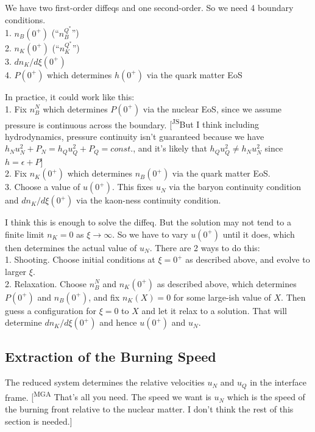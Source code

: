 \documentclass[11pt]{article}
\newcommand{\mga}[1]{{\color[rgb]{0.8,0,0}#1}}
\newcommand{\mgacom}[1]{\textsf{\color[rgb]{0.6,0,0}[\textsuperscript{MGA} #1]}}
\newcommand{\JScom}[1]{\textsf{\color{violet} [\textsuperscript{JS}#1]}}
\begin{document}
\mga{We have two first-order diffeqs and one second-order. So we need 4 boundary conditions. \\
1. $n_B(0^+)$ \quad (``$n_B^{Q^*}$'') \\
2. $n_K(0^+)$ \quad (``$n_K^{Q^*}$'') \\
3. $dn_K/d\xi(0^+)$ \\
4. $P(0^+)$ which determines $h(0^+)$ via the quark matter EoS

\medskip
In practice, it could work like this: \\
1. Fix $n_B^N$ which determines $P(0^+)$ via the nuclear EoS, since we assume pressure is continuous across the boundary. \JScom{But I think including hydrodynamics, pressure continuity isn't guaranteed because we have $h_Nu_N^2 + P_N = h_Qu_Q^2 + P_Q = const.$, and it's likely that $h_Qu_Q^2 \neq h_N u_N^2$ since $h = \epsilon + P$}\\
2. Fix $n_K(0^+)$ which determines $n_B(0^+)$ via the quark matter EoS.\\
3. Choose a value of $u(0^+)$. This fixes $u_N$ via the baryon continuity condition and $dn_K/d\xi(0^+)$ via the kaon-ness continuity condition. 

\bigskip
I think this is enough to solve the diffeq. But the solution may not tend to a finite limit $n_K=0$ as 
$\xi\to\infty$. So we have to vary
$u(0^+)$ until it does, which then 
determines the actual value of $u_N$. 
There are 2 ways to do this:\\
1. Shooting. Choose initial conditions at $\xi=0^+$ as described above, and evolve to larger $\xi$. \\
2. Relaxation. Choose $n_B^N$ and $n_K(0^+)$ as described above, which determines $P(0^+)$ and $n_B(0^+)$, and fix $n_K(X)=0$ for some large-ish value of $X$. Then guess a configuration for $\xi=0$ to $X$ and let it relax to a solution. That will determine $dn_K/d\xi(0^+)$ and hence $u(0^+)$ and $u_N$. 
}


\subsection*{Extraction of the Burning Speed}

The reduced system determines the relative velocities 
$u_N$ and $u_Q$ in the interface frame.
\mgacom{That's all you need. The speed we want is $u_N$ which is the speed of the burning front relative to the nuclear matter. I don't think the rest of this section is needed.}
\end{document}
